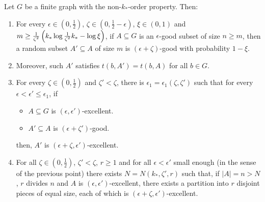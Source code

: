     \lemma[Claim 5.13]\label{claim_5.13}
        Let $G$ be a finite graph with the non-$k_{*}$-order property.
        Then:
        \begin{enumerate}[label=(\alph*), ref=\alph*]
            \item \label{itm:5.13.1} For every $\epsilon \in \left(0, \frac{1}{2}\right)$,
                $\zeta \in \left(0, \frac{1}{2} - \epsilon \right)$, $\xi \in \left(0, 1 \right)$ and
                $m \geq \frac{1}{\zeta^2}\left( k_* \log{\frac{1}{\zeta^2}k_*} - \log{\xi} \right)$,
                if $A \subseteq G$ is an $\epsilon$-good subset of size $n \geq m$,
                then a random subset $A' \subseteq A$ of size $m$ is $(\epsilon + \zeta)$-good with probability $1-\xi$.
            \item \label{itm:5.13.1*} Moreover, such $A'$ satisfies $t(b, A') = t(b, A)$ for all $b \in G$.
            \item \label{itm:5.13.2} For every $\zeta \in \left(0, \frac{1}{2}\right)$ and $\zeta' < \zeta$, there is
                $\epsilon_1 = \epsilon_1(\zeta, \zeta')$ such that for every $\epsilon < \epsilon' \leq \epsilon_1$, if
                \begin{itemize}
                    \item $A \subseteq G$ is $\left( \epsilon, \epsilon' \right)$-excellent.
                    \item $A' \subseteq A$ is $\left( \epsilon + \zeta' \right)$-good.
                \end{itemize}
                then, $A'$ is $\left( \epsilon + \zeta, \epsilon' \right)$-excellent.
            \item \label{itm:5.13.3} For all $\zeta \in \left(0, \frac{1}{2}\right)$, $\zeta' < \zeta$, $r \geq 1$ and for all
                $\epsilon < \epsilon'$ small enough (in the sense of the previous point) there exists
                $N = N\left(k_{*}, \zeta', r \right)$ such that, if $|A| = n > N$, $r$ divides $n$ and $A$ is
                $\left( \epsilon, \epsilon' \right)$-excellent, there exists a partition into $r$ disjoint pieces of equal
                size, each of which is $\left( \epsilon + \zeta, \epsilon' \right)$-excellent.
        \end{enumerate}
